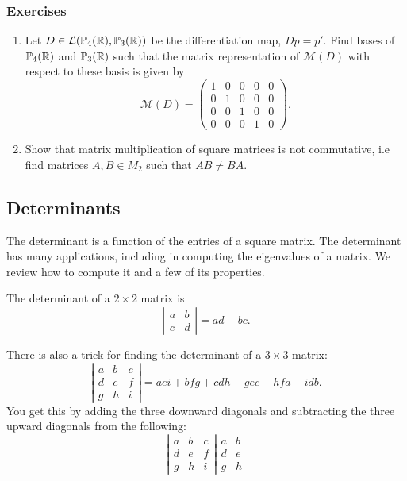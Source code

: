 \documentclass{article}
\begin{document}
\subsubsection{Exercises}

\begin{enumerate}
    \item Let $D \in \mathcal{L}(\mathbb{P}_4({\mathbb{R}}),\mathbb{P}_3({\mathbb{R}}))$ be the differentiation map, $Dp = p'$. Find bases of $\mathbb{P}_4({\mathbb{R}})$ and $\mathbb{P}_3({\mathbb{R}})$ such that the matrix representation of $\mathcal{M}(D)$ with respect to these basis is given by 
    \begin{equation*}
    \mathcal{M}(D) = \begin{pmatrix}
    1 & 0 & 0 & 0 & 0 \\
    0 & 1 & 0 & 0 & 0 \\
    0 & 0 & 1 & 0 & 0 \\
    0 & 0 & 0 & 1 & 0
     \end{pmatrix}.
    \end{equation*}
     \item Show that matrix multiplication of square matrices is not commutative, i.e find matrices $A,B \in M_{2}$ such that $AB\neq BA$.
\end{enumerate}

\subsection{Determinants}
The determinant is a function of the entries of a square matrix. The determinant has many applications, including in computing the eigenvalues of a matrix. We review how to compute it and a few of its properties. 

The determinant of a $2 \times 2$ matrix is 
$$\left| \begin{matrix} a & b \\ c & d \end{matrix} \right| = ad-bc.$$

There is also a trick for finding the determinant of a $3 \times 3$ matrix:
$$\left| \begin{matrix} a & b &c \\ d & e & f \\ g & h &i \end{matrix} \right| = aei + bfg + cdh - gec -hfa -idb.$$
You get this by adding the three downward diagonals and subtracting the three upward diagonals from the following:
$$ \left| \begin{matrix} a & b &c \\ d & e & f \\ g & h &i \end{matrix} \right| \begin{matrix} a & b \\ d & e\\g & h  \end{matrix} $$
\end{document}
